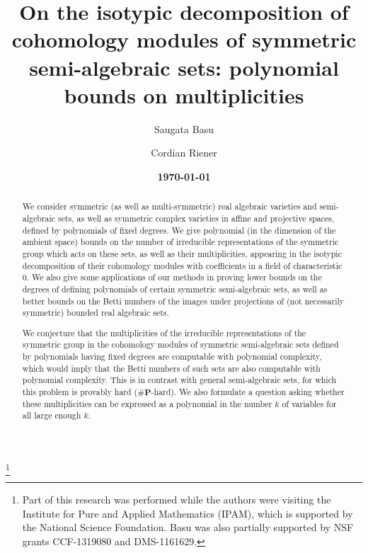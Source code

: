 \documentclass{amsart}
\theoremstyle{definition}
\theoremstyle{remark}
\numberwithin{equation}{section}
\begin{document}
\title[On the isotypic decomposition of cohomology modules]
{
On the isotypic decomposition of cohomology modules of symmetric semi-algebraic sets: polynomial bounds on multiplicities
}
\author{Saugata Basu}
\address{Department of Mathematics,
Purdue University, West Lafayette, IN 47906, U.S.A.}

\author{Cordian Riener}
\address{Aalto Science Institute\\
Aalto University, Espoo\\
Finland}

\date{\textbf{\today}}

\thanks{Part of this research was performed while the authors were visiting the Institute for Pure and Applied Mathematics (IPAM), which is supported by the National Science Foundation.
Basu was also  partially supported by NSF grants
CCF-1319080 and DMS-1161629. 
 }

\begin{abstract}
We consider symmetric (as well as multi-symmetric) 
real algebraic varieties and semi-algebraic sets, as well
as symmetric complex varieties in affine and projective spaces,
defined by polynomials of fixed degrees. 
We give polynomial (in the dimension of the ambient space) bounds on
the number of irreducible representations of the symmetric group which acts on these sets,
as well as their multiplicities, 
appearing in the isotypic decomposition of their cohomology modules with coefficients in a field
of characteristic $0$.
We also give some applications of our methods in proving lower bounds on the degrees
of defining polynomials of certain symmetric semi-algebraic sets, as well as better bounds on the
Betti numbers of the images under projections of (not necessarily symmetric) bounded
real algebraic sets.

We conjecture that the multiplicities 
of the irreducible representations of the symmetric group  
in the cohomology modules of symmetric semi-algebraic sets defined by polynomials having fixed degrees
are computable with polynomial complexity, which would imply
that the Betti numbers of such sets are also computable with polynomial complexity. This is in contrast with general semi-algebraic sets, for which this problem is provably hard 
($\#\mathbf{P}$-hard). 
We also formulate a question asking whether these multiplicities can be expressed
as a polynomial in the number $k$ of variables for all large enough $k$.
 \end{abstract}
\end{document}
